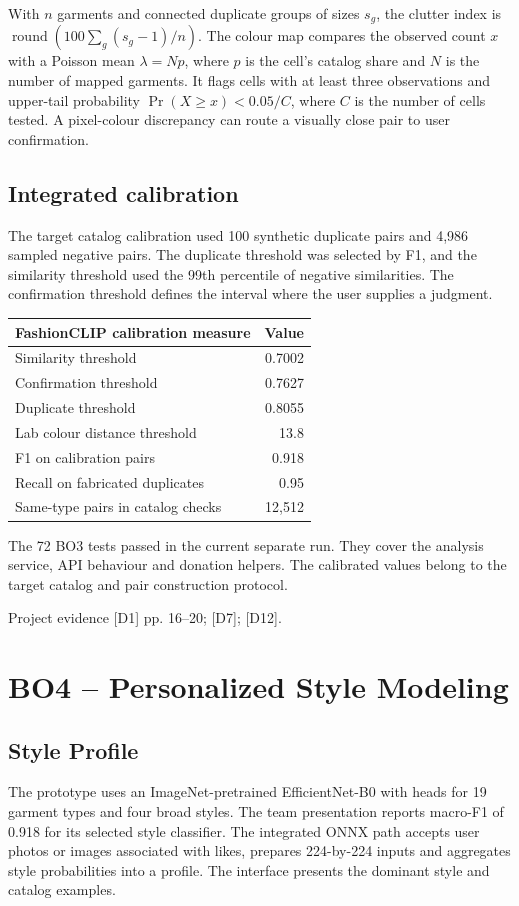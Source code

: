 \documentclass[11pt,a4paper]{article}
\newcommand{\src}[1]{\par{\footnotesize\textcolor{muted}{Project evidence #1.}}\par}
\begin{document}
With \(n\) garments and connected duplicate groups of sizes \(s_g\), the clutter index is \(\operatorname{round}(100\sum_g(s_g-1)/n)\). The colour map compares the observed count \(x\) with a Poisson mean \(\lambda=Np\), where \(p\) is the cell's catalog share and \(N\) is the number of mapped garments. It flags cells with at least three observations and upper-tail probability \(\Pr(X\ge x)<0.05/C\), where \(C\) is the number of cells tested. A pixel-colour discrepancy can route a visually close pair to user confirmation.

\subsection*{Integrated calibration}
The target catalog calibration used 100 synthetic duplicate pairs and 4,986 sampled negative pairs. The duplicate threshold was selected by F1, and the similarity threshold used the 99th percentile of negative similarities. The confirmation threshold defines the interval where the user supplies a judgment.

\begin{tabularx}{\linewidth}{@{}Yr@{}}
\toprule
\textbf{FashionCLIP calibration measure} & \textbf{Value} \\
\midrule
Similarity threshold & 0.7002 \\
Confirmation threshold & 0.7627 \\
Duplicate threshold & 0.8055 \\
Lab colour distance threshold & 13.8 \\
F1 on calibration pairs & 0.918 \\
Recall on fabricated duplicates & 0.95 \\
Same-type pairs in catalog checks & 12,512 \\
\bottomrule
\end{tabularx}

The 72 BO3 tests passed in the current separate run. They cover the analysis service, API behaviour and donation helpers. The calibrated values belong to the target catalog and pair construction protocol.
\src{[D1] pp. 16--20; [D7]; [D12]}

\clearpage
\section{BO4 -- Personalized Style Modeling}
\subsection*{Style Profile}
The prototype uses an ImageNet-pretrained EfficientNet-B0 with heads for 19 garment types and four broad styles. The team presentation reports macro-F1 of 0.918 for its selected style classifier. The integrated ONNX path accepts user photos or images associated with likes, prepares 224-by-224 inputs and aggregates style probabilities into a profile. The interface presents the dominant style and catalog examples.
\end{document}
